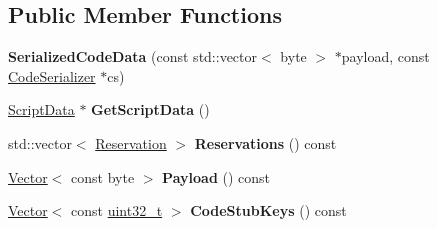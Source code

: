 \subsection*{Public Member Functions}
\begin{DoxyCompactItemize}
\item 
\mbox{\label{classv8_1_1internal_1_1SerializedCodeData_a927774e4b3f611d4c3255bb2dfc33c4c}} 
{\bfseries Serialized\+Code\+Data} (const std\+::vector$<$ byte $>$ $\ast$payload, const \mbox{\hyperlink{classv8_1_1internal_1_1CodeSerializer}{Code\+Serializer}} $\ast$cs)
\item 
\mbox{\label{classv8_1_1internal_1_1SerializedCodeData_ac3f0b4f3c07b6218574be530df3772e7}} 
\mbox{\hyperlink{classv8_1_1internal_1_1ScriptData}{Script\+Data}} $\ast$ {\bfseries Get\+Script\+Data} ()
\item 
\mbox{\label{classv8_1_1internal_1_1SerializedCodeData_a6223c32016188cfafb817654f53c8ccf}} 
std\+::vector$<$ \mbox{\hyperlink{classv8_1_1internal_1_1SerializedData_1_1Reservation}{Reservation}} $>$ {\bfseries Reservations} () const
\item 
\mbox{\label{classv8_1_1internal_1_1SerializedCodeData_ade394399a6953a078ffb5279e46b90ba}} 
\mbox{\hyperlink{classv8_1_1internal_1_1Vector}{Vector}}$<$ const byte $>$ {\bfseries Payload} () const
\item 
\mbox{\label{classv8_1_1internal_1_1SerializedCodeData_a59a355428429f34d8d14ef13fa36f5c9}} 
\mbox{\hyperlink{classv8_1_1internal_1_1Vector}{Vector}}$<$ const \mbox{\hyperlink{classuint32__t}{uint32\+\_\+t}} $>$ {\bfseries Code\+Stub\+Keys} () const
\end{DoxyCompactItemize}
